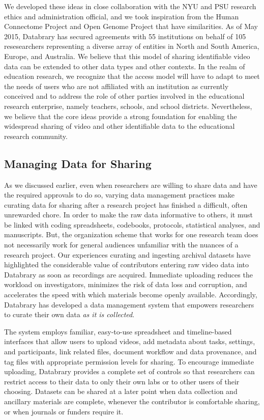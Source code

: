 \documentclass[letterpaper,man,apacite]{apa6}
\begin{document}
We developed these ideas in close collaboration with the NYU and PSU research ethics and administration official, and we took inspiration from the Human Connectome Project and Open Genome Project that have similarities.
As of May 2015, Databrary has secured agreements with 55 institutions on behalf of 105 resesearchers representing a diverse array of entities in North and South America, Europe, and Australia.
We believe that this model of sharing identifiable video data can be extended to other data types and other contexts.
In the realm of education research, we recognize that the access model will have to adapt to meet the needs of users who are not affiliated with an institution as currently conceived and to address the role of other parties involved in the educational research enterprise, namely teachers, schools, and school districts.
Nevertheless, we believe that the core ideas provide a strong foundation for enabling the widespread sharing of video and other identifiable data to the educational research community.

\subsection{Managing Data for Sharing}

As we discussed earlier, even when researchers are willing to share data and have the required approvals to do so, varying data management practices make curating data for sharing after a research project has finished a difficult, often unrewarded chore.
In order to make the raw data informative to others, it must be linked with coding spreadsheets, codebooks, protocols, statistical analyses, and manuscripts.
But, the organization scheme that works for one research team does not necessarily work for general audiences unfamiliar with the nuances of a research project.
Our experiences curating and ingesting archival datasets have highlighted the considerable value of contributors entering raw video data into Databrary as soon as recordings are acquired. 
Immediate uploading reduces the workload on investigators, minimizes the risk of data loss and corruption, and accelerates the speed with which materials become openly available. 
Accordingly, Databrary has developed a data management system that empowers researchers to curate their own data \emph{as it is collected}.

The system employs familiar, easy-to-use spreadsheet and timeline-based interfaces that allow users to upload videos, add metadata about tasks, settings, and participants, link related files, document workflow and data provenance, and tag files with appropriate permission levels for sharing. 
To encourage immediate uploading, Databrary provides a complete set of controls so that researchers can restrict
access to their data to only their own labs or to other users of their choosing. 
Datasets can be shared at a later point when data collection and ancillary materials are complete, whenever the contributor is comfortable sharing, or when journals or funders require it. 
\end{document}
